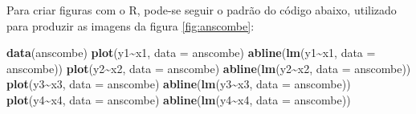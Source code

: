 \documentclass[
	12pt,				%
	oneside,			%
	a4paper,			%
	chapter=TITLE,		%
	section=TITLE,		%
	english,			%
	brazil				%
	]{abntex2}
\let\proglang=\textsf
\newenvironment{Shaded}{\begin{snugshade}}{\end{snugshade}}
\newcommand{\AttributeTok}[1]{\textcolor[rgb]{0.13,0.29,0.53}{#1}}
\newcommand{\FunctionTok}[1]{\textcolor[rgb]{0.13,0.29,0.53}{\textbf{#1}}}
\newcommand{\NormalTok}[1]{#1}
\newcommand{\SpecialCharTok}[1]{\textcolor[rgb]{0.81,0.36,0.00}{\textbf{#1}}}
\begin{document}
Para criar figuras com o \proglang{R}, pode-se seguir o padrão do código
abaixo, utilizado para produzir as imagens da figura \ref{fig:anscombe}:
\begin{Shaded}
\begin{Highlighting}[]
\FunctionTok{data}\NormalTok{(anscombe)}
\FunctionTok{plot}\NormalTok{(y1}\SpecialCharTok{\textasciitilde{}}\NormalTok{x1, }\AttributeTok{data =}\NormalTok{ anscombe)}
\FunctionTok{abline}\NormalTok{(}\FunctionTok{lm}\NormalTok{(y1}\SpecialCharTok{\textasciitilde{}}\NormalTok{x1, }\AttributeTok{data =}\NormalTok{ anscombe))}
\FunctionTok{plot}\NormalTok{(y2}\SpecialCharTok{\textasciitilde{}}\NormalTok{x2, }\AttributeTok{data =}\NormalTok{ anscombe)}
\FunctionTok{abline}\NormalTok{(}\FunctionTok{lm}\NormalTok{(y2}\SpecialCharTok{\textasciitilde{}}\NormalTok{x2, }\AttributeTok{data =}\NormalTok{ anscombe))}
\FunctionTok{plot}\NormalTok{(y3}\SpecialCharTok{\textasciitilde{}}\NormalTok{x3, }\AttributeTok{data =}\NormalTok{ anscombe)}
\FunctionTok{abline}\NormalTok{(}\FunctionTok{lm}\NormalTok{(y3}\SpecialCharTok{\textasciitilde{}}\NormalTok{x3, }\AttributeTok{data =}\NormalTok{ anscombe))}
\FunctionTok{plot}\NormalTok{(y4}\SpecialCharTok{\textasciitilde{}}\NormalTok{x4, }\AttributeTok{data =}\NormalTok{ anscombe)}
\FunctionTok{abline}\NormalTok{(}\FunctionTok{lm}\NormalTok{(y4}\SpecialCharTok{\textasciitilde{}}\NormalTok{x4, }\AttributeTok{data =}\NormalTok{ anscombe))}
\end{Highlighting}
\end{Shaded}
\end{document}
